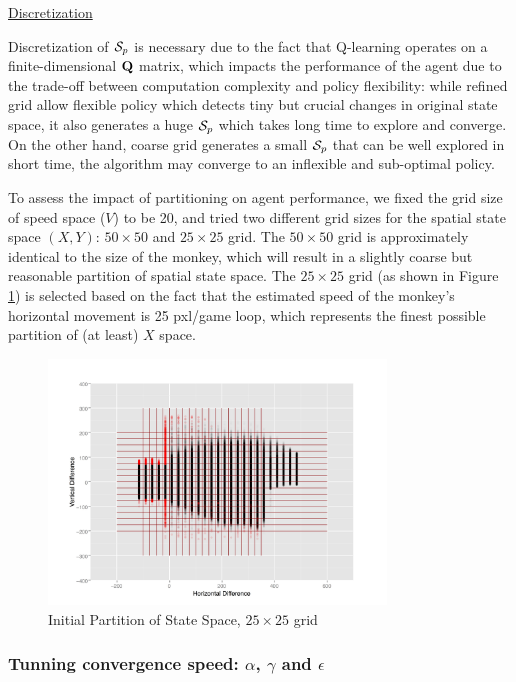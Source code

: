 \documentclass[11pt]{article}
\theoremstyle{definition}
\begin{document}
\underline{Discretization}

Discretization of ${\cal S}_p$ is necessary due to the fact that Q-learning operates on a finite-dimensional ${\bf Q}$ matrix, which impacts the performance of the agent due to the trade-off between computation complexity and policy flexibility: while refined grid allow flexible policy which detects tiny but crucial changes in original state space, it also generates a huge ${\cal S}_p$ which takes long time to explore and converge. On the other hand, coarse grid generates a small ${\cal S}_p$ that can be well explored in short time, the algorithm may converge to an inflexible and sub-optimal policy.

To assess the impact of partitioning on agent performance, we fixed the grid size of speed space ($V$) to be 20, and tried two different grid sizes for the spatial state space $(X, Y)$: $50 \times 50$ and $25 \times 25$ grid. The $50 \times 50$ grid is approximately identical to the size of the monkey, which will result in a slightly coarse but reasonable partition of spatial state space. The $25 \times 25$ grid (as shown in Figure \ref{fig:part_initial}) is selected based on the fact that the estimated speed of the monkey's horizontal movement is 25 pxl/game loop, which represents the finest possible partition of (at least) $X$ space.

\begin{figure}[h!]
  \centering
      \includegraphics[width=0.8\textwidth]{"./plots/s_scatter"}
  \caption{Initial Partition of State Space, $25 \times 25$ grid}
  \label{fig:part_initial}
\end{figure}

\subsubsection{\textbf{Tunning convergence speed: $\alpha$, $\gamma$ and $\epsilon$}}
\end{document}
